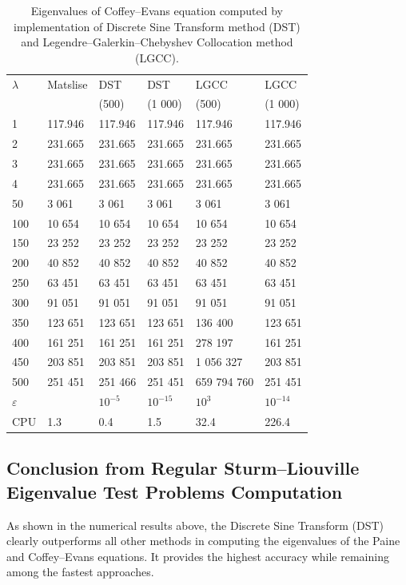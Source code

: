 \documentclass[11pt,a4paper,oneside,openright]{report} %
\begin{document}
\begin{table}[H]
\centering
\caption{Eigenvalues of Coffey--Evans equation computed by implementation of Discrete Sine Transform method (DST) and Legendre--Galerkin--Chebyshev Collocation method (LGCC).}
\label{}
{\small
\begin{tabularx}{\textwidth}{l *{5}{X}}
\toprule
$\lambda$ & Matslise & DST  & DST & LGCC & LGCC \\
 &  & (500)  & (1 000) & (500) & (1 000) \\
\midrule
1 & 117.946 & 117.946 & 117.946 & 117.946 &  117.946 \\
2 & 231.665 & 231.665 & 231.665 & 231.665 &  231.665\\
3 & 231.665 & 231.665 & 231.665 & 231.665 & 231.665\\
4 & 231.665 & 231.665 & 231.665 & 231.665 &  231.665\\
50 & 3 061 & 3 061 & 3 061 & 3 061 & 3 061 \\
100 & 10 654 & 10 654 & 10 654 & 10 654 & 10 654 \\
150 & 23 252 & 23 252 & 23 252 & 23 252 &  23 252\\
200 & 40 852 & 40 852 & 40 852 & 40 852 & 40 852 \\
250 & 63 451 & 63 451 & 63 451 & 63 451 &  63 451 \\
300 & 91 051 & 91 051 & 91 051 & 91 051 & 91 051 \\
350 & 123 651 & 123 651 & 123 651 & 136 400 & 123 651 \\
400 & 161 251 & 161 251 & 161 251 & 278 197 & 161 251 \\
450 & 203 851 & 203 851 & 203 851 & 1 056 327 & 203 851 \\
500 & 251 451 & 251 466 & 251 451 & 659 794 760 & 251 451 \\
\midrule
$\varepsilon$ &  & $10^{-5}$ & $10^{-15}$ & $10^{3}$ & $10^{-14}$ \\
CPU & 1.3 & 0.4 & 1.5 & 32.4 & 226.4 \\
\bottomrule
\end{tabularx}
}
\end{table}


\subsection{Conclusion from Regular Sturm--Liouville Eigenvalue Test Problems Computation}
\noindent
As shown in the numerical results above, the Discrete Sine Transform (DST) clearly outperforms all other methods in computing the eigenvalues of the Paine and Coffey--Evans equations. It provides the highest accuracy while remaining among the fastest approaches.
\end{document}
